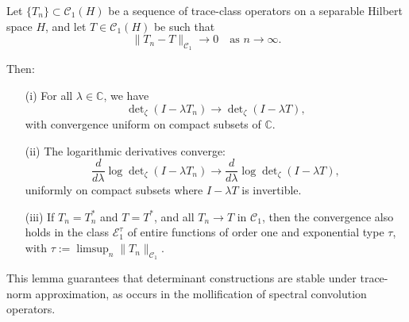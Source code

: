 \begin{lemma}
\label{lem:det_continuity_trace_norm}
Let \( \{ T_n \} \subset \mathcal{C}_1(H) \) be a sequence of trace-class operators on a separable Hilbert space \( H \), and let \( T \in \mathcal{C}_1(H) \) be such that
\[
\| T_n - T \|_{\mathcal{C}_1} \to 0 \quad \text{as } n \to \infty.
\]

Then:
\begin{enumerate}
  \item[\textnormal{(i)}] For all \( \lambda \in \mathbb{C} \), we have
  \[
  \det\nolimits_\zeta(I - \lambda T_n) \to \det\nolimits_\zeta(I - \lambda T),
  \]
  with convergence uniform on compact subsets of \( \mathbb{C} \).

  \item[\textnormal{(ii)}] The logarithmic derivatives converge:
  \[
  \frac{d}{d\lambda} \log \det\nolimits_\zeta(I - \lambda T_n)
  \to \frac{d}{d\lambda} \log \det\nolimits_\zeta(I - \lambda T),
  \]
  uniformly on compact subsets where \( I - \lambda T \) is invertible.

  \item[\textnormal{(iii)}] If \( T_n = T_n^* \) and \( T = T^* \), and all \( T_n \to T \) in \( \mathcal{C}_1 \), then the convergence also holds in the class \( \mathcal{E}_1^\tau \) of entire functions of order one and exponential type \( \tau \), with \( \tau := \limsup_{n} \|T_n\|_{\mathcal{C}_1} \).
\end{enumerate}

\noindent
This lemma guarantees that determinant constructions are stable under trace-norm approximation, as occurs in the mollification of spectral convolution operators.
\end{lemma}
% 